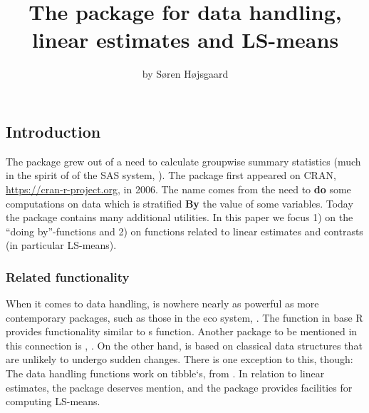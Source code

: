 \title{The  package for data handling, linear estimates and LS-means}
\author{by Søren Højsgaard}

\maketitle


\hypertarget{introduction}{%
\subsection{Introduction}\label{introduction}}

The  package \citep{doby} grew out of a need to calculate
groupwise summary statistics (much in the spirit of 
of the SAS system, \citep{procsummary}). The package first appeared on
CRAN, \url{https://cran-r-project.org}, in 2006. The name 
comes from the need to \textbf{do} some computations on data which is
stratified \textbf{By} the value of some variables. Today the package
contains many additional utilities. In this paper we focus 1) on the
``doing by''-functions and 2) on functions related to linear estimates
and contrasts (in particular LS-means).

\hypertarget{related-functionality}{%
\subsubsection{Related functionality}\label{related-functionality}}

When it comes to data handling,  is nowhere nearly as powerful
as more contemporary packages, such as those in the 
eco system, \citep{tidyverse}. The  function in base R
provides functionality similar to s  function.
Another package to be mentioned in this connection is
, \citet{data.table}. On the other hand, 
is based on classical data structures that are unlikely to undergo
sudden changes. There is one exception to this, though: The data
handling functions work on tibble`s, from 
\citet{tibble}. In relation to linear estimates, the 
package \citep{multcomp} deserves mention, and the 
package \citep{lsmeans} provides facilities for computing LS-means.

